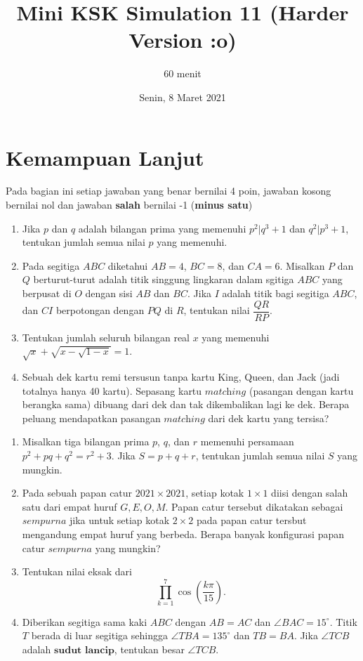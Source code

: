 \documentclass{article}
\title{Mini KSK Simulation 11 (Harder Version :o)}
\author{60 menit}
\date{Senin, 8 Maret 2021}
\begin{document}
	\maketitle
\section{Kemampuan Lanjut}
Pada bagian ini setiap jawaban yang benar bernilai 4 poin, jawaban kosong bernilai nol
dan jawaban \textbf{salah} bernilai -1 (\textbf{minus satu})	
	\begin{enumerate}
		\item Jika $p$ dan $q$ adalah bilangan prima yang memenuhi $p^2|q^3+1$ dan $q^2|p^3+1$, tentukan jumlah semua nilai $p$ yang memenuhi.
		
		\item Pada segitiga $ABC$ diketahui $AB=4$, $BC=8$, dan $CA=6$. Misalkan $P$ dan $Q$ berturut-turut adalah titik singgung lingkaran dalam sgitiga $ABC$ yang berpusat di $O$ dengan sisi $AB$ dan $BC$. Jika $I$ adalah titik bagi segitiga $ABC$, dan $CI$ berpotongan dengan $PQ$ di $R$, tentukan nilai $\dfrac{QR}{RP}$.
		
		\item Tentukan jumlah seluruh bilangan real $x$ yang memenuhi $\sqrt{x}+\sqrt{x-\sqrt{1-x}}=1$.
		
		\item Sebuah dek kartu remi tersusun tanpa kartu King, Queen, dan Jack (jadi totalnya hanya 40 kartu). Sepasang kartu $\textit{matching}$ (pasangan dengan kartu berangka sama) dibuang dari dek dan tak dikembalikan lagi ke dek. Berapa peluang mendapatkan pasangan $\textit{matching}$ dari dek kartu yang tersisa? 
	\end{enumerate}



\begin{enumerate}[resume]
	\item Misalkan tiga bilangan prima $p$, $q$, dan $r$ memenuhi persamaan $p^2+pq+q^2=r^2+3.$ Jika $S=p+q+r$, tentukan jumlah semua nilai $S$ yang mungkin. 
	
	\item Pada sebuah papan catur $2021 \times 2021$, setiap kotak $1\times1$ diisi dengan salah satu dari empat huruf $G,E,O,M$. Papan catur tersebut dikatakan sebagai $\textit{sempurna}$ jika untuk setiap kotak $2\times2$ pada papan catur tersbut mengandung empat huruf yang berbeda. Berapa banyak konfigurasi papan catur $\textit{sempurna}$ yang mungkin?
	
	\item Tentukan nilai eksak dari $$\prod_{k=1}^{7}\cos \left ( \frac{k\pi}{15} \right ).$$
	
	\item Diberikan segitiga sama kaki $ABC$ dengan $AB=AC$ dan $\angle BAC = 15^\circ$. Titik $T$ berada di luar segitiga sehingga $\angle TBA = 135^\circ$ dan $TB = BA$. Jika $\angle TCB$ adalah $\textbf{sudut lancip}$, tentukan besar $\angle TCB$.
\end{enumerate}
\end{document}

